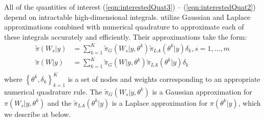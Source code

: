 \documentclass[ba]{imsart}
\begin{document}
All of the quantities of interest (\ref{eqn:interestedQuat3}) -- (\ref{eqn:interestedQuat2}) depend on intractable high-dimensional integrals. \cite{casecross} utilize Gaussian and Laplace approximations combined with numerical quadrature to approximate each of these integrals accurately and efficiently. Their approximations take the form:
\begin{equation}\begin{aligned}\label{eqn:integration}
\tilde{\pi}(W_{s}|y) &= \sum_{k=1}^{K}
\tilde{\pi}_{G}(W_{s}|y,\theta^{k})
\tilde{\pi}_{LA}(\theta^{k}|y)\delta_{k}, s = 1,\ldots,m \\
\tilde{\pi}(W|y) &= \sum_{k=1}^{K}
\tilde{\pi}_{G}(W|y,\theta^{k})
\tilde{\pi}_{LA}(\theta^{k}|y)\delta_{k} \\
\end{aligned}\end{equation}
where $\left\{\theta^{k},\delta_{k}\right\}_{k=1}^{K}$ is a set of nodes and weights corresponding to an appropriate numerical quadrature rule. The $\tilde{\pi}_{G}(W_{s}|y,\theta^{k})$ is a Gaussian approximation for $\pi(W_{s}|y,\theta^{k})$ and the $\tilde{\pi}_{LA}(\theta^{k}|y)$ is a Laplace approximation for $\pi(\theta^{k}|y)$, which we describe at below.
\end{document}
